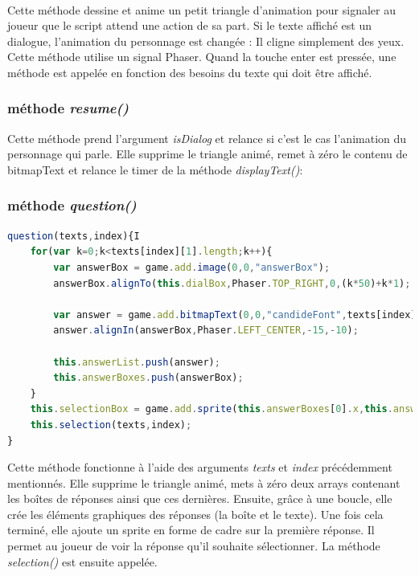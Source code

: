 \documentclass[11pt]{article}
\begin{document}
\begin{appendices}
\paragraph{}
Cette méthode dessine et anime un petit triangle d'animation pour signaler au joueur que le script attend une action de sa part. Si le texte affiché est un dialogue, l'animation du personnage est changée : Il cligne simplement des yeux. Cette méthode utilise un signal Phaser. Quand la touche enter est pressée, une méthode est appelée en fonction des besoins du texte qui doit être affiché.
\subsubsection{méthode \textit{resume()}}
Cette méthode prend l'argument \textit{isDialog} et relance si c'est le cas l'animation du personnage qui parle. Elle supprime le triangle animé, remet à zéro le contenu de bitmapText et relance le timer de la méthode \textit{displayText()}:

\subsubsection{méthode \textit{question()}}
\begin{lstlisting}[language=JavaScript]   
question(texts,index){I
    for(var k=0;k<texts[index][1].length;k++){
        var answerBox = game.add.image(0,0,"answerBox");
        answerBox.alignTo(this.dialBox,Phaser.TOP_RIGHT,0,(k*50)+k*1);
        
        var answer = game.add.bitmapText(0,0,"candideFont",texts[index][1][k],50);
        answer.alignIn(answerBox,Phaser.LEFT_CENTER,-15,-10);
        
        this.answerList.push(answer);
        this.answerBoxes.push(answerBox);
    }
    this.selectionBox = game.add.sprite(this.answerBoxes[0].x,this.answerBoxes[0].y,"selection");
    this.selection(texts,index);
}
\end{lstlisting} 
Cette méthode fonctionne à l'aide des arguments \textit{texts} et \textit{index} précédemment mentionnés. Elle supprime le triangle animé, mets à zéro deux arrays contenant les boîtes de réponses ainsi que ces dernières. Ensuite, grâce à une boucle, elle crée les éléments graphiques des réponses (la boîte et le texte). Une fois cela terminé, elle ajoute un sprite en forme de cadre sur la première réponse. Il permet au joueur de voir la réponse qu'il souhaite sélectionner. La méthode \textit{selection()} est ensuite appelée.


\end{appendices}
\end{document}
